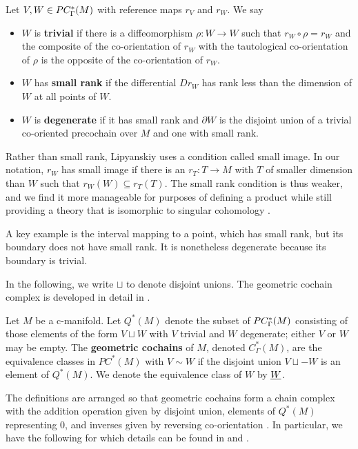 \begin{definition}\label{D:cman types}
	Let $V, W\in PC_\Gamma^*(M)$ with reference maps $r_V$ and $r_W$.
	We say
	\begin{itemize}
		\item $W$ is \textbf{trivial} if there is a diffeomorphism $\rho \colon W \to W$ such that $r_W \circ \rho = r_W$
		and the composite of the co-orientation of $r_W$ with the tautological co-orientation of $\rho$ is the opposite of the co-orientation of $r_W$.
		\item $W$ has \textbf{small rank} if the differential $D r_W$ has rank less than the dimension of $W$ at all points of $W$.
		\item $W$ is \textbf{degenerate} if it has small rank and ${\partial W}$ is the disjoint union of a trivial co-oriented precochain over $M$ and one with small rank.
	\end{itemize}
\end{definition}

Rather than small rank, Lipyanskiy uses a condition called small image.
In our notation, $r_W$ has small image if there is an $r_T \colon T \to M$ with $T$ of smaller dimension than $W$ such that $r_W(W) \subseteq r_T(T)$.
The small rank condition is thus weaker, and we find it more manageable for purposes of defining a product while still providing a theory that is isomorphic to singular cohomology \cite[Theorem 5.34]{medina2022foundations}.

A key example is the interval mapping to a point, which has small rank, but its boundary does not have small rank.
It is nonetheless degenerate because its boundary is trivial.

In the following, we write $\sqcup$ to denote disjoint unions.
The geometric cochain complex is developed in detail in \cite[Section 4.2]{medina2022foundations}.

\begin{definition}\label{D:geometric cohomology}
	Let $M$ be a c-manifold. Let $Q^*(M)$ denote the subset of $PC_\Gamma^*(M)$ consisting of  those elements of the form $V \sqcup W$ with $V$ trivial and $W$ degenerate; either $V$ or $W$ may be empty.
	The \textbf{geometric cochains} of $M$, denoted $C_\Gamma^*(M)$, are the equivalence classes in $PC^*(M)$ with $V \sim W$ if the disjoint union $V \sqcup -W$ is an element of $Q^*(M)$.
	We denote the equivalence class of $W$ by $\underline{W}$.
\end{definition}

The definitions are arranged so that geometric cochains form a chain complex with the addition operation given by disjoint union, elements of $Q^*(M)$ representing $0$, and inverses given by reversing co-orientation \cite[Lemma 4.19]{medina2022foundations}.
In particular, we have the following for which details can be found in \cite{Lipy14} and \cite[Lemma 3.26]{medina2022foundations}.

